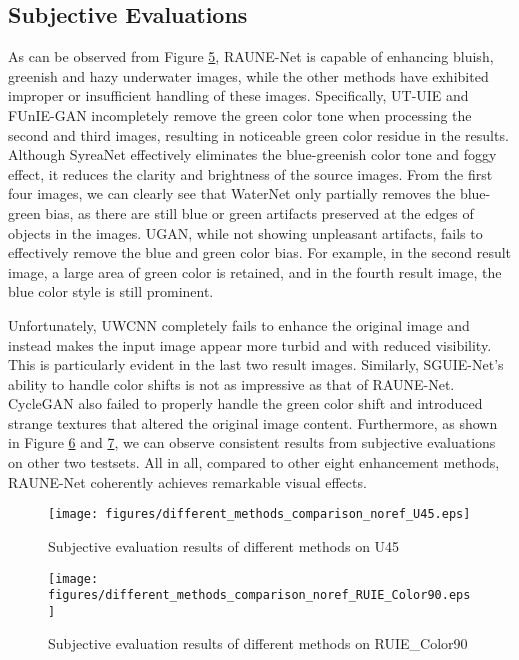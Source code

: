 \documentclass[runningheads]{llncs}
\begin{document}
\subsection{Subjective Evaluations}
As can be observed from Figure \hyperref[different-methods-noref-U45]{5}, RAUNE-Net is capable of enhancing bluish, greenish and hazy underwater images, while the other methods have exhibited improper or insufficient handling of these images. Specifically, UT-UIE and FUnIE-GAN incompletely remove the green color tone when processing the second and third images, resulting in noticeable green color residue in the results. Although SyreaNet effectively eliminates the blue-greenish color tone and foggy effect, it reduces the clarity and brightness of the source images. From the first four images, we can clearly see that WaterNet only partially removes the blue-green bias, as there are still blue or green artifacts preserved at the edges of objects in the images. UGAN, while not showing unpleasant artifacts, fails to effectively remove the blue and green color bias. For example, in the second result image, a large area of green color is retained, and in the fourth result image, the blue color style is still prominent.

Unfortunately, UWCNN completely fails to enhance the original image and instead makes the input image appear more turbid and with reduced visibility. This is particularly evident in the last two result images. Similarly, SGUIE-Net's ability to handle color shifts is not as impressive as that of RAUNE-Net. CycleGAN also failed to properly handle the green color shift and introduced strange textures that altered the original image content. Furthermore, as shown in Figure \hyperref[different-methods-noref-RUIE-Color90]{6} and \hyperref[different-methods-noref-UPoor200]{7}, we can observe consistent results from subjective evaluations on other two testsets. All in all, compared to other eight enhancement methods, RAUNE-Net coherently achieves remarkable visual effects.

\begin{figure}
    \centering
    \texttt{[image: figures/different\_methods\_comparison\_noref\_U45.eps]}
    \caption{Subjective evaluation results of different methods on U45}
    \label{different-methods-noref-U45}
\end{figure}

\begin{figure}
    \centering
    \texttt{[image: figures/different\_methods\_comparison\_noref\_RUIE\_Color90.eps]}
    \caption{Subjective evaluation results of different methods on RUIE\_Color90}
    \label{different-methods-noref-RUIE-Color90}
\end{figure}
\end{document}
